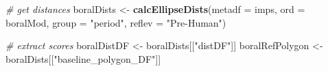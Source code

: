 \documentclass[nofonts,]{tufte-handout}
\newenvironment{Shaded}{\begin{snugshade}}{\end{snugshade}}
\newcommand{\AttributeTok}[1]{\textcolor[rgb]{0.13,0.29,0.53}{#1}}
\newcommand{\CommentTok}[1]{\textcolor[rgb]{0.56,0.35,0.01}{\textit{#1}}}
\newcommand{\FunctionTok}[1]{\textcolor[rgb]{0.13,0.29,0.53}{\textbf{#1}}}
\newcommand{\NormalTok}[1]{#1}
\newcommand{\OtherTok}[1]{\textcolor[rgb]{0.56,0.35,0.01}{#1}}
\newcommand{\StringTok}[1]{\textcolor[rgb]{0.31,0.60,0.02}{#1}}
\begin{document}
\begin{Shaded}
\begin{Highlighting}[]
\CommentTok{\# get distances}
\NormalTok{boralDists }\OtherTok{\textless{}{-}} \FunctionTok{calcEllipseDists}\NormalTok{(}\AttributeTok{metadf =}\NormalTok{ imps,}
                               \AttributeTok{ord =}\NormalTok{ boralMod,}
                               \AttributeTok{group =} \StringTok{"period"}\NormalTok{,}
                               \AttributeTok{reflev =} \StringTok{"Pre{-}Human"}\NormalTok{)}

\CommentTok{\# extract scores}
\NormalTok{boralDistDF }\OtherTok{\textless{}{-}}\NormalTok{ boralDists[[}\StringTok{"distDF"}\NormalTok{]]}
\NormalTok{boralRefPolygon }\OtherTok{\textless{}{-}}\NormalTok{ boralDists[[}\StringTok{"baseline\_polygon\_DF"}\NormalTok{]]}


\end{Highlighting}
\end{Shaded}
\end{document}
